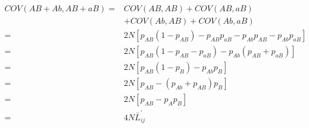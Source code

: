 \documentclass[12pt]{article}
\providecommand{\DIFaddbegin}{} %
\providecommand{\DIFaddend}{} %
\providecommand{\DIFdelbegin}{} %
\providecommand{\DIFdelend}{} %
\newcommand{\DIFscaledelfig}{0.5}
\newlength{\DIFdelgraphicswidth} %
\newlength{\DIFdelgraphicsheight} %
\newcommand{\DIFaddincludegraphics}[2][]{{\color{blue}\fbox{\DIFOincludegraphics[#1]{#2}}}} %
\newcommand{\DIFdelincludegraphics}[2][]{%
\sbox{\DIFdelgraphicsbox}{\DIFOincludegraphics[#1]{#2}}%
\settoboxwidth{\DIFdelgraphicswidth}{\DIFdelgraphicsbox} %
\settoboxtotalheight{\DIFdelgraphicsheight}{\DIFdelgraphicsbox} %
\scalebox{\DIFscaledelfig}{%
\parbox[b]{\DIFdelgraphicswidth}{\usebox{\DIFdelgraphicsbox}\\[-\baselineskip] \rule{\DIFdelgraphicswidth}{0em}}\llap{\resizebox{\DIFdelgraphicswidth}{\DIFdelgraphicsheight}{%
\setlength{\unitlength}{\DIFdelgraphicswidth}%
\begin{picture}(1,1)%
\thicklines\linethickness{2pt} %
{\color[rgb]{1,0,0}\put(0,0){\framebox(1,1){}}}%
{\color[rgb]{1,0,0}\put(0,0){\line( 1,1){1}}}%
{\color[rgb]{1,0,0}\put(0,1){\line(1,-1){1}}}%
\end{picture}%
}\hspace*{3pt}}} %
} %
\DeclareRobustCommand{\DIFaddbegin}{\DIFOaddbegin \let\includegraphics\DIFaddincludegraphics} %
\DeclareRobustCommand{\DIFaddend}{\DIFOaddend \let\includegraphics\DIFOincludegraphics} %
\DeclareRobustCommand{\DIFdelbegin}{\DIFOdelbegin \let\includegraphics\DIFdelincludegraphics} %
\DeclareRobustCommand{\DIFdelend}{\DIFOaddend \let\includegraphics\DIFOincludegraphics} %
\begin{document}
\begin{bibunit}
\begin{equation}
\DIFdelbegin %
\DIFdelend \DIFaddbegin \begin{array}{rl}
COV(AB+Ab, AB+aB) =& COV(AB, AB)+COV(AB, aB)\\
&+COV(Ab, AB)+COV(Ab, aB)\\
=& 2N\left[p_{AB}(1-p_{AB})-p_{AB}p_{aB}-p_{Ab}p_{AB}-p_{Ab}p_{aB}\right]\\
=& 2N\left[p_{AB}(1-p_{AB}-p_{aB})-p_{Ab}(p_{AB}+p_{aB})\right]\\
=& 2N\left[p_{AB}(1-p_{B})-p_{Ab}p_{B}\right]\\
=& 2N\left[p_{AB}-(p_{Ab}+p_{AB})p_{B}\right]\\
=& 2N\left[p_{AB}-p_{A}p_{B}\right]\\
=& 4N\bar{L}^{'}_{ij}\\
\end{array}\DIFaddend 
\end{equation}


\end{bibunit}
\end{document}
